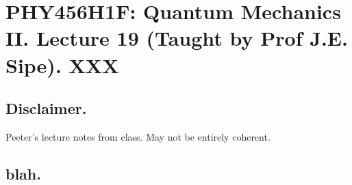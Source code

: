 
%

\chapter{PHY456H1F: Quantum Mechanics II.  Lecture 19 (Taught by Prof J.E. Sipe).  XXX}
\label{chap:qmTwoL19}
{}
\date{Nov XX, 2011}

\beginArtWithToc

\section{Disclaimer.}

Peeter's lecture notes from class.  May not be entirely coherent.

\section{blah.}

\cite{desai2009quantum}

\EndArticle
